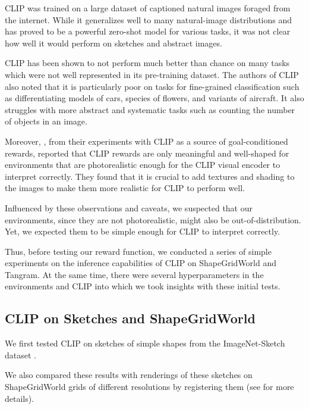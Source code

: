 CLIP was trained on a large dataset of captioned natural images foraged from the internet.
While it generalizes well to many natural-image distributions and has proved to be a powerful zero-shot model for various tasks, it was not clear how well it would perform on sketches and abstract images. 

CLIP has been shown to not perform much better than chance on many tasks which were not well represented in its pre-training dataset.
The authors of CLIP also noted that it is particularly poor on tasks for fine-grained classification such as differentiating models of cars, species of flowers, and variants of aircraft.
It also struggles with more abstract and systematic tasks such as counting the number of objects in an image.

Moreover, \cite{vlmrm}, from their experiments with CLIP as a source of goal-conditioned rewards, reported that CLIP rewards are only meaningful and well-shaped for environments that are photorealistic enough for the CLIP visual encoder to interpret correctly.
They found that it is crucial to add textures and shading to the images to make them more realistic for CLIP to perform well.

Influenced by these observations and caveats, we suspected that our environments, since they are not photorealistic, might also be out-of-distribution. 
Yet, we expected them to be simple enough for CLIP to interpret correctly.

Thus, before testing our reward function, we conducted a series of simple experiments on the inference capabilities of CLIP on ShapeGridWorld and Tangram.
At the same time, there were several hyperparameters in the environments and CLIP into which we took insights with these initial tests.


\subsection{CLIP on Sketches and ShapeGridWorld}
\label{sec:clip-sketches}

We first tested CLIP on sketches of simple shapes from the ImageNet-Sketch dataset \citep{imagenet}.

We also compared these results with renderings of these sketches on ShapeGridWorld grids of different resolutions by registering them (see  for more details).

